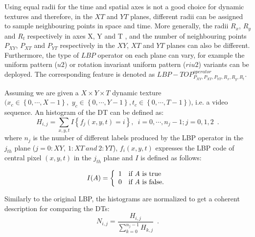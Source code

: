 Using equal radii for the time and spatial axes is not a good choice for dynamic textures \cite{zhao2007dynamic} and therefore, in the $XT$ and $YT$ planes, different radii can be assigned to sample neighbouring points in space and time. More generally, the radii $R_{x}$, $R_{y}$  and $R_{t}$ respectively in axes X, Y and T , and the number of neighbouring points $P_{XY}$, $P_{XT}$ and $P_{YT}$ respectively in the $XY$, $XT$ and $YT$ planes can also be different. Furthermore, the type of $LBP$ operator on each plane can vary, for example the uniform pattern ($u2$) or rotation invariant uniform pattern ($riu2$) variants \cite{inen2011computer} can be deployed. The corresponding feature is denoted as $LBP-TOP_{P_{XY},P_{XT},P_{YT},R_{x},R_{y},R_{t}}^{operator}$.

Assuming we are given a $X\times Y \times T$ dynamic texture \\ $(x_c \in \left\{0,\cdots,X-1\right\},$ $y_c \in\left\{0,\cdots,Y-1\right\}, t_c\in\left\{0,\cdots,T-1\right\})$, i.e. a video sequence. An histogram of the DT can be defined as: 
\begin{equation}
H_{i,j}=\sum_{x,y,t}I\left\{f_{j}(x,y,t)=i\right\},\enspace i=0,\cdots,n_j-1;j=0,1,2 \enspace.
\end{equation}
where $n_j$ is the number of different labels produced by the LBP operator in the $j_{th}$ plane ($j=0: XY,~1: XT~and~2: YT$), $f_i(x,y,t)$ expresses the LBP code of central pixel $(x,y,t)$ in the $j_{th}$ plane and $I$ is defined as follows:

\begin{equation}
I(A) = \left\{ 
  \begin{array}{l l}
    1 &  \textrm{if $A$ is true}\\
    0 &  \textrm{if $A$ is false.}\\
  \end{array} \right.
\end{equation}


Similarly to the original LBP, the histograms are normalized to get a coherent description for comparing the DTs:
\begin{equation}
N_{i,j}=\frac{H_{i,j}}{\sum_{k=0}^{n_j-1}H_{k,j}} \enspace .
\end{equation}


